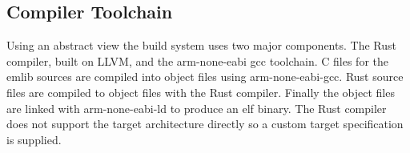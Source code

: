 \subsection{Compiler Toolchain}

Using an abstract view the build system uses two major components.
The Rust compiler, built on LLVM, and the arm-none-eabi gcc toolchain.
C files for the emlib sources are compiled into object files using arm-none-eabi-gcc.
Rust source files are compiled to object files with the Rust compiler.
Finally the object files are linked with arm-none-eabi-ld to produce an elf binary.
The Rust compiler does not support the target architecture directly so a custom target specification is supplied.


